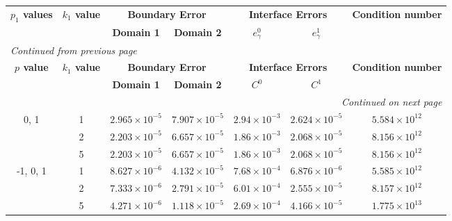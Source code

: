 \begin{table}[!htbp]
    \centering
    \begin{longtable}{ccccccc}
        \toprule
        \multicolumn{1}{c}{\textbf{\(p_1\) values}} & \multicolumn{1}{c}{\textbf{\(k_1\) value}} & \multicolumn{2}{c}{\textbf{Boundary Error}} & \multicolumn{2}{c}{\textbf{Interface Errors}} & \multicolumn{1}{c}{\textbf{Condition number}} \\
        \cmidrule(lr){2-2} \cmidrule(lr){3-4} \cmidrule(lr){5-6} \cmidrule(lr){7-7}
        & & \textbf{Domain 1} & \textbf{Domain 2} & \textbf{\(e_\gamma^0\)} & \textbf{\(e_\gamma^1\)} & \\
        \midrule
        \endfirsthead %
        \multicolumn{7}{l}{{\footnotesize\emph{Continued from previous page}}} \\
        \toprule
        \multicolumn{1}{c}{\textbf{\(p\) value}} & \multicolumn{1}{c}{\textbf{\(k_1\) value}} & \multicolumn{2}{c}{\textbf{Boundary Error}} & \multicolumn{2}{c}{\textbf{Interface Errors}} & \multicolumn{1}{c}{\textbf{Condition number}} \\
        \cmidrule(lr){2-2} \cmidrule(lr){3-4} \cmidrule(lr){5-6} \cmidrule(lr){7-7}
        & & \textbf{Domain 1} & \textbf{Domain 2} & \textbf{\(C^0\)} & \textbf{\(C^1\)} & \\
        \midrule
        \endhead %
        \midrule[\heavyrulewidth] %
        \multicolumn{7}{r}{{\footnotesize\emph{Continued on next page}}} \\
        \endfoot %
        \bottomrule
        \endlastfoot %

        0, 1 & 1 & $2.965\times10^{-5}$ & $7.907\times10^{-5}$ & $2.94\times10^{-3}$ & $2.624\times10^{-5}$ & $5.584\times10^{12}$ \\
        & 2 & $2.203\times10^{-5}$ & $6.657\times10^{-5}$ & $1.86\times10^{-3}$ & $2.068\times10^{-5}$ & $8.156\times10^{12}$ \\
        & 5 & $2.203\times10^{-5}$ & $6.657\times10^{-5}$ & $1.86\times10^{-3}$ & $2.068\times10^{-5}$ & $8.156\times10^{12}$ \\
        \midrule[\heavyrulewidth] %

        -1, 0, 1 & 1 & $8.627\times10^{-6}$ & $4.132\times10^{-5}$ & $7.68\times10^{-4}$ & $6.876\times10^{-6}$ & $5.585\times10^{12}$ \\
        & 2 & $7.333\times10^{-6}$ & $2.791\times10^{-5}$ & $6.01\times10^{-4}$ & $2.555\times10^{-5}$ & $8.157\times10^{12}$ \\
        & 5 & $4.271\times10^{-6}$ & $1.118\times10^{-5}$ & $2.69\times10^{-4}$ & $4.166\times10^{-5}$ & $1.775\times10^{13}$ \\
        \midrule[\heavyrulewidth] %


\end{longtable}
\end{table}

